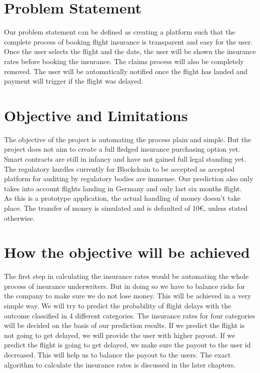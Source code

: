\section{Problem Statement}
Our problem statement can be defined as creating a platform such that the complete process of booking flight insurance is transparent and easy for the user. Once the user selects the flight and the date, the user will be shown the insurance rates before booking the insurance. The claims process will also be completely removed. The user will be automatically notified once the flight has landed and payment will trigger if the flight was delayed.

\section{Objective and Limitations}
The objective of the project is automating the process plain and simple. But the project does not aim to create a full fledged insurance purchasing option yet. Smart contracts are still in infancy and have not gained full legal standing yet. The regulatory hurdles currently for Blockchain to be accepted as accepted platform for auditing by regulatory bodies are immense.
Our prediction also only takes into account flights landing in Germany and only last six months flight.
\\As this is a prototype application, the actual handling of money doesn't take place. The transfer of money is simulated and is defaulted of 10€, unless stated otherwise. 

\section{How the objective will be achieved}
The first step in calculating the insurance rates would be automating the whole process of insurance underwriters. But in doing so we have to balance risks for the company to make sure we do not lose money. This will be achieved in a very simple way. We will try to predict the probability of flight delays with the outcome classified in 4 different categories. The insurance rates for four categories will be decided on the basis of our prediction results. If we predict the flight is not going to get delayed, we will provide the user with higher payout. If we predict the flight is going to get delayed, we make sure the payout to the user id decreased. This will help us to balance the payout to the users. The exact algorithm to calculate the insurance rates is discussed in the later chapters. 
